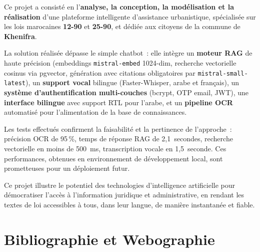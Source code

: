 \documentclass[12pt,a4paper]{report}
\begin{document}
Ce projet a consisté en l'\textbf{analyse, la conception, la modélisation et la réalisation} d'une plateforme intelligente d'assistance urbanistique, spécialisée sur les lois marocaines \textbf{12-90} et \textbf{25-90}, et dédiée aux citoyens de la commune de \textbf{Khenifra}.

La solution réalisée dépasse le simple chatbot~: elle intègre un \textbf{moteur RAG} de haute précision (embeddings \texttt{mistral-embed} 1024-dim, recherche vectorielle cosinus via pgvector, génération avec citations obligatoires par \texttt{mistral-small-latest}), un \textbf{support vocal} bilingue (Faster-Whisper, arabe et français), un \textbf{système d'authentification multi-couches} (bcrypt, OTP email, JWT), une \textbf{interface bilingue} avec support RTL pour l'arabe, et un \textbf{pipeline OCR} automatisé pour l'alimentation de la base de connaissances.

Les tests effectués confirment la faisabilité et la pertinence de l'approche~: précision OCR de 95\,\%, temps de réponse RAG de 2,1~secondes, recherche vectorielle en moins de 500~ms, transcription vocale en 1,5~seconde. Ces performances, obtenues en environnement de développement local, sont prometteuses pour un déploiement futur.

Ce projet illustre le potentiel des technologies d'intelligence artificielle pour démocratiser l'accès à l'information juridique et administrative, en rendant les textes de loi accessibles à tous, dans leur langue, de manière instantanée et fiable.

\chapter*{Bibliographie et Webographie}
\end{document}
